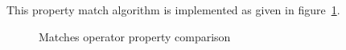 This property match algorithm is implemented as given in figure~\ref{fig:implementation:matchesproperty}.

\begin{figure}[h!]
	\centering
	\def\stackalignment{r}
	\caption{Matches operator property comparison}
	\label{fig:implementation:matchesproperty}
\end{figure}


